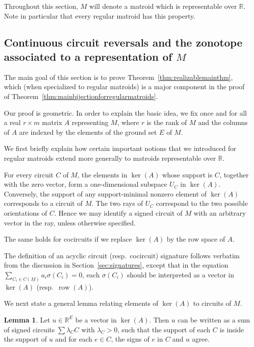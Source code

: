 \documentclass[12pt]{amsart}
\numberwithin{equation}{section}
\theoremstyle{definition}
\newtheorem{lemma}[theorem]{Lemma}
\newcommand{\row}{\operatorname{row}}
\begin{document}
Throughout this section, $M$ will denote a matroid which is representable over $\mathbb{R}$.  
Note in particular that every regular matroid has this property.

\subsection{Continuous circuit reversals and the zonotope associated to a representation of $M$}
\label{sec:continuousreversals}

The main goal of this section is to prove Theorem~\ref{thm:realizablemainthm}, which (when specialized to regular matroids) is a major component in the proof of Theorem~\ref{thm:mainbijectionforregularmatroids}. 

Our proof is geometric. In order to explain the basic idea, we fix once and for all a real $r \times m$ matrix $A$ representing $M$, where $r$ is the rank of $M$ and the columns of $A$ are indexed by the elements of the ground set $E$ of $M$.

\medskip

We first briefly explain how certain important notions that we introduced for regular matroids extend more generally to matroids 
representable over $\mathbb{R}$. 

For every circuit $C$ of $M$, the elements in $\ker(A)$ whose support is $C$, together with the zero vector, form a one-dimensional subspace $U_C$ in $\ker(A)$. 
Conversely, the support of any support-minimal nonzero element of $\ker(A)$ corresponds to a circuit of $M$. 
The two rays of $U_C$ correspond to the two possible orientations of $C$. Hence we may identify a signed circuit of $M$ with an arbitrary vector in the ray, unless otherwise specified. 

The same holds for cocircuits if we replace $\ker(A)$ by the row space of $A$.

The definition of an acyclic circuit (resp.~cocircuit) signature follows verbatim from the discussion in Section~\ref{sec:signatures}, except that in the equation $\sum_{C_i \in C(\underline{M})} a_i \sigma(C_i) = 0$, each $\sigma(C_i)$ should be interpreted as a vector in $\ker(A)$ (resp.~$\row(A)$).

\medskip

We next state a general lemma relating elements of $\ker(A)$ to circuits of $M$.

\begin{lemma} \label{lem:circuitdecomposition}
Let $u\in\mathbb{R}^E$ be a vector in $\ker(A)$. Then $u$ can be written as a sum of signed circuits $\sum \lambda_C C$ with $\lambda_C>0$, such that the support of each $C$ is inside the support of $u$ and for each $e\in C$, the signs of $e$ in $C$ and $u$ agree.
\end{lemma}
\end{document}
